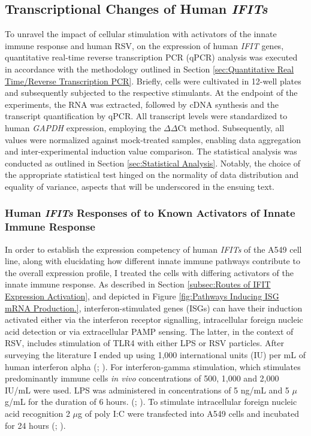 \subsection{Transcriptional Changes of Human \textit{IFITs}} \label{subsec:Transcriptional Changes of Human IFITs}
To unravel the impact of cellular stimulation with activators of the innate immune response and human RSV, on the expression of human \textit{IFIT} genes, quantitative real-time reverse transcription PCR (qPCR) analysis was executed in accordance with the methodology outlined in Section \ref{sec:Quantitative Real Time/Reverse Transcription PCR}. Briefly, cells were cultivated in 12-well plates and subsequently subjected to the respective stimulants. At the endpoint of the experiments, the RNA was extracted, followed by cDNA synthesis and the transcript quantification by qPCR. All transcript levels were standardized to human \textit{GAPDH} expression, employing  the 
\(\Delta\)\(\Delta\)Ct method. Subsequently, all values were normalized against mock-treated samples, enabling data aggregation and inter-experimental induction value comparison. The statistical analysis was conducted as outlined in Section \ref{sec:Statistical Analysis}. Notably, the choice of the appropriate statistical test hinged on the normality of data distribution and equality of variance, aspects that will be underscored in the ensuing text.



\subsubsection{Human \textit{IFITs} Responses of to Known Activators of Innate Immune Response} \label{Human IFIT Responses to Known Activators of Innate Immune Response}
In order to establish the expression competency of human \textit{IFITs} of the A549 cell line, along with elucidating how different innate immune pathways contribute to the overall expression profile, I treated the cells with differing activators of the innate immune response. As described in Section \ref{subsec:Routes of IFIT Expression Activation}, and depicted in Figure \ref{fig:Pathways Inducing ISG mRNA Production.},  interferon-stimulated genes (ISGs) can have their induction activated either via the interferon receptor signalling, intracellular foreign nucleic acid detection or via extracellular PAMP sensing. The latter, in the context of RSV, includes stimulation of TLR4 with either LPS or RSV particles. After surveying the literature I ended up using 1,000 international units (IU) per mL of human interferon alpha (\cite{Terenzi2006DistinctISG56}; \cite{Santhakumar2018ChickenViruses}). For interferon-gamma stimulation, which stimulates predominantly immune cells \textit{in vivo} concentrations of 500, 1,000 and 2,000 IU/mL were used. LPS was administered in concentrations of 5 ng/mL and 5 \(\mu\)g/mL for the duration of 6 hours. (\cite{Mears2019Ifit1Cells}; \cite{Zhang2019GrouperResponse}). To stimulate intracellular foreign nucleic acid recognition 2 \(\mu\)g of poly I:C were transfected into A549 cells and incubated for 24 hours (\cite{Mears2019Ifit1Cells}; \cite{Palchetti2015TransfectedCells}).

